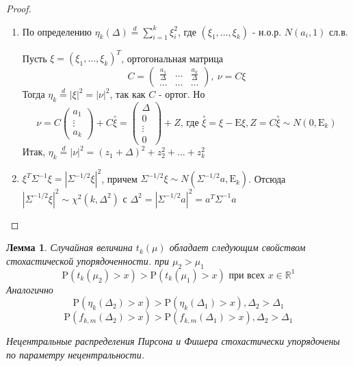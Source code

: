 \documentclass[12pt]{article}
\newtheorem{lemma}{Лемма}
\theoremstyle{basic_theorem}
\theoremstyle{name_theorem}
\def\R{ \mathbb{R} }
\def\E{ \mathrm{E} }
\def\P{ \mathrm{P} }
\begin{document}
\begin{proof}
    \begin{enumerate}
        \item По определению \(\eta_k(\Delta)\overset{d}{=}\sum_{i=1}^k\xi^2_i\),
        где \((\xi_1,\ldots,\xi_k)\) - н.о.р. \(N(a_i,1)\) сл.в.

        Пусть \(\xi=(\xi_1,\ldots, \xi_k)^T\), ортогональная матрица
        \[C=\begin{pmatrix}
            \frac{a_1}{\Delta}& \ldots& \frac{a_k}{\Delta} \\
            \ldots & \ldots &\ldots
        \end{pmatrix},\ \nu=C\xi\]
        Тогда \(\eta_k\overset{d}{=}\left\lvert \xi \right\rvert ^2=\left\lvert \nu \right\rvert ^2\), так как \(C\) - ортог.
        Но
        \[\nu=C\begin{pmatrix}
            a_1 \\
            \vdots \\
            a_k
        \end{pmatrix} + C\overset{\circ}{\xi}=\begin{pmatrix}
            \Delta \\
            0 \\
            \vdots \\
            0
        \end{pmatrix} + Z \mbox{, где \(\overset{\circ}{\xi}=\xi-\E\xi, Z=C\overset{\circ}{\xi}\sim N(0, \E_k)\)}\]
        Итак, \(\eta_k\overset{d}{=}\left\lvert \nu \right\rvert ^2=(z_1+\Delta)^2+z_2^2+\ldots+z_k^2\)

        \item \(\xi^T\Sigma^{-1}\xi=\left\lvert \Sigma^{-1/2}\xi \right\rvert ^2\), причем \(\Sigma^{-1/2}\xi\sim N(\Sigma^{-1/2}a, \E_k)\).
        Отсюда \(\left\lvert \Sigma^{-1/2}\xi \right\rvert ^2\sim\chi^2(k,\Delta^2)\) с \(\Delta^2=\left\lvert \Sigma^{-1/2}a \right\rvert ^2=a^T\Sigma^{-1}a\)
    \end{enumerate}
\end{proof}
    \begin{lemma}
        Случайная величина \(t_k(\mu)\) обладает следующим свойством стохастической упорядоченности.
        при \(\mu_2>\mu_1\)
        \begin{equation}\label{iid::st}
            \P\left(t_k(\mu_2)>x\right) > \P\left(t_k(\mu_1)>x\right)\mbox{ при всех \(x\in\R^1\)}
        \end{equation}
        Аналогично
        \begin{equation}\label{iid::xi}
            \P(\eta_k(\Delta_2)>x) > \P(\eta_k(\Delta_1)>x), \Delta_2>\Delta_1
        \end{equation}
        \begin{equation}\label{iid::fi}
            \P(f_{k,m}(\Delta_2)>x) > \P(f_{k,m}(\Delta_1)>x), \Delta_2>\Delta_1
        \end{equation}
    \begin{leftbar}
        Нецентральные распределения Пирсона и Фишера стохастически упорядочены
        по параметру нецентральности.
    \end{leftbar}
    \end{lemma}
\end{document}
